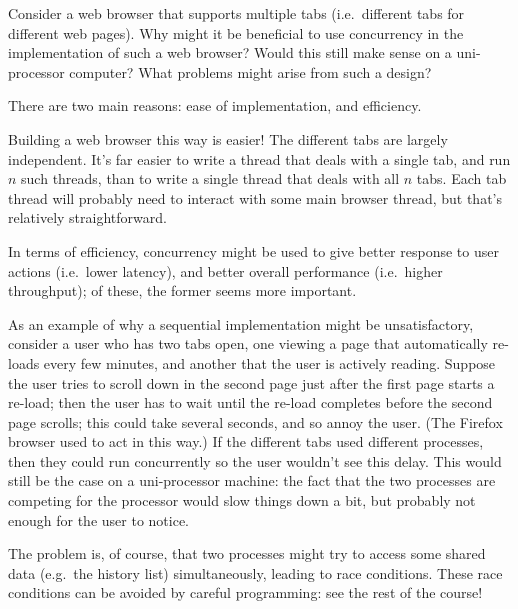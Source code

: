\begin{nontutequestion}
Consider a web browser that supports multiple tabs (i.e.~different
tabs for different web pages).  Why might it be beneficial to use
concurrency in the implementation of such a web browser?  Would this
still make sense on a uni-processor computer?  What problems might
arise from such a design?
\end{nontutequestion}


\begin{nontuteanswer}
There are two main reasons: ease of implementation, and efficiency.

Building a web browser this way is easier!  The different tabs are largely
independent.  It's far easier to write a thread that deals with a single tab,
and run $n$ such threads, than to write a single thread that deals with all
$n$ tabs.  Each tab thread will probably need to interact with some main
browser thread, but that's relatively straightforward.

In terms of efficiency, concurrency might be used to give better response to
user actions (i.e.\ lower latency), and better overall performance (i.e.\
higher throughput); of these, the former seems more important.

As an example of why a sequential implementation might be unsatisfactory,
consider a user who has two tabs open, one viewing a page that automatically
re-loads every few minutes, and another that the user is actively reading.
Suppose the user tries to scroll down in the second page just after the first
page starts a re-load; then the user has to wait until the re-load completes
before the second page scrolls; this could take several seconds, and so annoy
the user.  (The Firefox browser used to act in this way.)  If the different
tabs used different processes, then they could run concurrently so the user
wouldn't see this delay.  This would still be the case on a uni-processor
machine: the fact that the two processes are competing for the processor would
slow things down a bit, but probably not enough for the user to notice.

The problem is, of course, that two processes might try to access some shared
data (e.g.~the history list) simultaneously, leading to race conditions.
These race conditions can be avoided by careful programming: see the rest of
the course!
\end{nontuteanswer}
